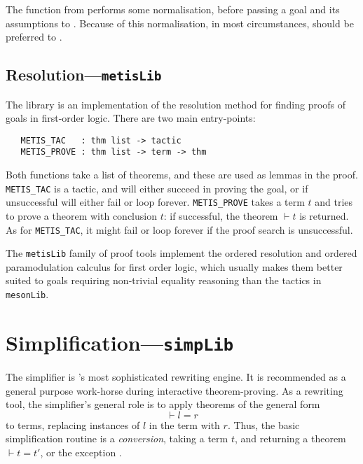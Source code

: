 {The  function from  performs some
normalisation, before passing a goal and its assumptions to
.  Because of this normalisation, in most
circumstances,  should be preferred to
.

\subsection{Resolution---\texttt{metisLib}}
\label{sec:metisLib}


The  library is an implementation of the resolution method
for finding proofs of goals in first-order logic. There are two main
entry-points:

\begin{hol}
\begin{verbatim}
   METIS_TAC   : thm list -> tactic
   METIS_PROVE : thm list -> term -> thm
\end{verbatim}
\end{hol}

Both functions take a list of theorems, and these are used as lemmas
in the proof. \texttt{METIS\_TAC} is a tactic, and will either succeed
in proving the goal, or if unsuccessful will either fail or loop
forever. \texttt{METIS\_PROVE} takes a term $t$ and tries to prove a
theorem with conclusion $t$: if successful, the theorem $\vdash t$ is
returned. As for \texttt{METIS\_TAC}, it might fail or loop forever if
the proof search is unsuccessful.

The \texttt{metisLib} family of proof tools implement the ordered
resolution and ordered paramodulation calculus for first order logic,
which usually makes them better suited to goals requiring non-trivial
equality reasoning than the tactics in \texttt{mesonLib}.


\section{Simplification---\texttt{simpLib}}
\label{sec:simpLib}

The simplifier is \HOL's most sophisticated rewriting engine.  It is
recommended as a general purpose work-horse during interactive
theorem-proving.  As a rewriting tool, the simplifier's general role
is to apply theorems of the general form
\[
\vdash l = r
\]
to terms, replacing instances of $l$ in the term with $r$. Thus, the
basic simplification routine is a \emph{conversion}, taking a term
$t$, and returning a theorem $\vdash t = t'$, or the exception
.

}
